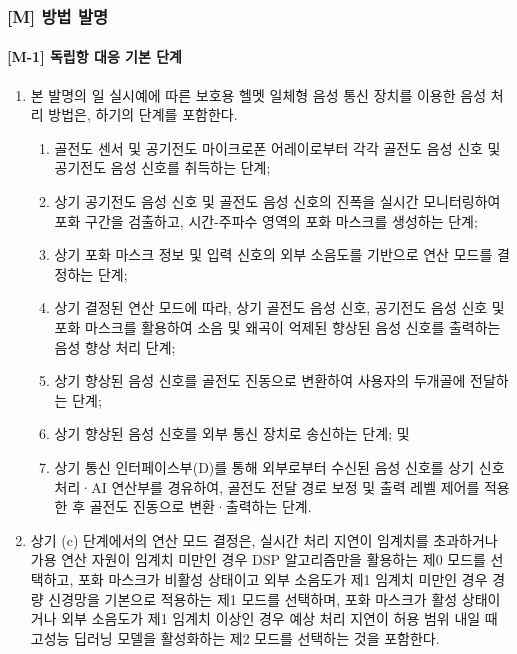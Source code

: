 \documentclass{article}
\DeclareRobustCommand{\codexedit}[1]{\textcolor{customorange}{#1}}
\begin{document}
\subsubsection{[M] 방법 발명}

\paragraph{[M-1] 독립항 대응 기본 단계}

\begin{enumerate}[label = \textbf{(M.1.\arabic*)}]

    \item 본 발명의 일 실시예에 따른 보호용 헬멧 일체형
    음성 통신 장치를 이용한 음성 처리 방법은, 하기의
    단계를 포함한다.

    \begin{enumerate}[label = \textbf{(\alph*)}]

        \item 골전도 센서 및 공기전도 마이크로폰 어레이로부터 각각 골전도 음성 신호 및 공기전도 음성 신호를 취득하는 단계;

        \item 상기 공기전도 음성 신호 및 골전도 음성 신호의 진폭을 실시간 모니터링하여 포화 구간을 검출하고, 시간-주파수 영역의 포화 마스크를 생성하는 단계;

        \item 상기 포화 마스크 정보 및 입력 신호의 외부 소음도를 기반으로 연산 모드를 결정하는 단계;

        \item 상기 결정된 연산 모드에 따라, 상기 골전도 음성 신호, 공기전도 음성 신호 및 포화 마스크를 활용하여 소음 및 왜곡이 억제된 향상된 음성 신호를 출력하는 음성 향상 처리 단계;

        \item 상기 향상된 음성 신호를 골전도 진동으로 변환하여 사용자의 두개골에 전달하는 단계;

        \item 상기 향상된 음성 신호를 외부 통신 장치로 송신하는 단계; 및

        \item 상기 통신 인터페이스부(D)를 통해 외부로부터 수신된 음성 신호를 상기 신호처리·AI 연산부를 경유하여, 골전도 전달 경로 보정 및 출력 레벨 제어를 적용한 후 골전도 진동으로 변환·출력하는 단계.

    \end{enumerate}

    \item \codexedit{상기 (c) 단계에서의 연산 모드 결정은, 실시간 처리 지연이 임계치를 초과하거나 가용 연산 자원이 임계치 미만인 경우 DSP 알고리즘만을 활용하는 제0 모드를 선택하고, 포화 마스크가 비활성 상태이고 외부 소음도가 제1 임계치 미만인 경우 경량 신경망을 기본으로 적용하는 제1 모드를 선택하며, 포화 마스크가 활성 상태이거나 외부 소음도가 제1 임계치 이상인 경우 예상 처리 지연이 허용 범위 내일 때 고성능 딥러닝 모델을 활성화하는 제2 모드를 선택하는 것을 포함한다.}



\end{enumerate}
\end{document}
